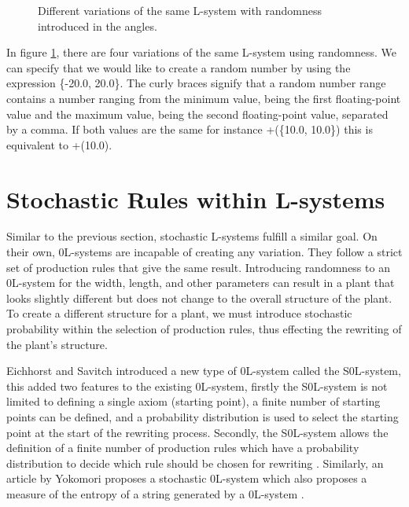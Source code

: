 \begin{figure}[htbp]

	{\centering
		\setlength{\fboxrule}{0pt}
		\caption{Different variations of the same L-system with randomness introduced in the angles. \label{figRandomness}}
	}
\end{figure}
\FloatBarrier

\noindent
In figure \ref{figRandomness}, there are four variations of the same L-system using randomness. We can specify that we would like to create a random number by using the expression \{-20.0, 20.0\}. The curly braces signify that a random number range contains a number ranging from the minimum value, being the first floating-point value and the maximum value, being the second floating-point value, separated by a comma. If both values are the same for instance +(\{10.0, 10.0\}) this is equivalent to +(10.0).

\section{Stochastic Rules within L-systems} \label{Stochastic L-system Subsection}

Similar to the previous section, stochastic L-systems fulfill a similar goal. On their own, 0L-systems are incapable of creating any variation. They follow a strict set of production rules that give the same result. Introducing randomness to an 0L-system for the width, length, and other parameters can result in a plant that looks slightly different but does not change to the overall structure of the plant. To create a different structure for a plant, we must introduce stochastic probability within the selection of production rules, thus effecting the rewriting of the plant's structure.

Eichhorst and Savitch introduced a new type of 0L-system called the S0L-system, this added two features to the existing 0L-system, firstly the S0L-system is not limited to defining a single axiom (starting point), a finite number of starting points can be defined, and a probability distribution is used to select the starting point at the start of the rewriting process. Secondly, the S0L-system allows the definition of a finite number of production rules which have a probability distribution to decide which rule should be chosen for rewriting \cite{eichhorst1980growth}. Similarly, an article by Yokomori proposes a stochastic 0L-system which also proposes a measure of the entropy of a string generated by a 0L-system \cite{yokomori1980stochastic}.

